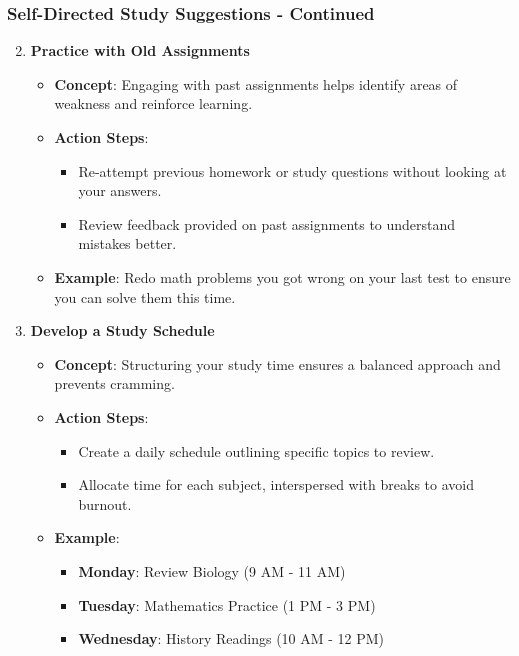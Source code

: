 \documentclass[aspectratio=169]{beamer}
\begin{document}
\begin{frame}[fragile]
    \frametitle{Self-Directed Study Suggestions - Continued}
    \begin{enumerate}
        \setcounter{enumi}{1}
        \item \textbf{Practice with Old Assignments}
        \begin{itemize}
            \item \textbf{Concept}: Engaging with past assignments helps identify areas of weakness and reinforce learning.
            \item \textbf{Action Steps}:
            \begin{itemize}
                \item Re-attempt previous homework or study questions without looking at your answers.
                \item Review feedback provided on past assignments to understand mistakes better.
            \end{itemize}
            \item \textbf{Example}: Redo math problems you got wrong on your last test to ensure you can solve them this time.
        \end{itemize}

        \item \textbf{Develop a Study Schedule}
        \begin{itemize}
            \item \textbf{Concept}: Structuring your study time ensures a balanced approach and prevents cramming.
            \item \textbf{Action Steps}:
            \begin{itemize}
                \item Create a daily schedule outlining specific topics to review.
                \item Allocate time for each subject, interspersed with breaks to avoid burnout.
            \end{itemize}
            \item \textbf{Example}: 
            \begin{itemize}
                \item \textbf{Monday}: Review Biology (9 AM - 11 AM)
                \item \textbf{Tuesday}: Mathematics Practice (1 PM - 3 PM)
                \item \textbf{Wednesday}: History Readings (10 AM - 12 PM)
            \end{itemize}
        \end{itemize}
    \end{enumerate}
\end{frame}
\end{document}
